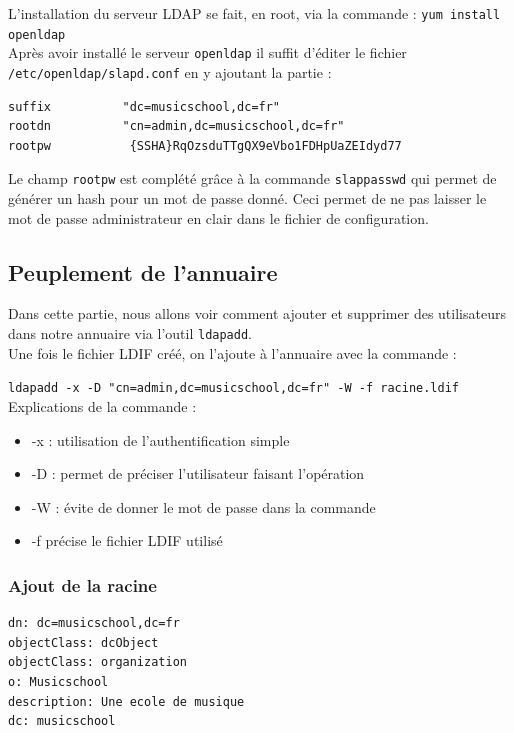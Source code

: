 \documentclass[12pt,a4paper,notitlepage]{article}
\begin{document}
L'installation du serveur LDAP se fait, en root, via la commande : \texttt{yum install openldap}\\

Après avoir installé le serveur \texttt{openldap} il suffit d'éditer le fichier \texttt{/etc/openldap/slapd.conf} en y ajoutant la partie : 

\begin{lstlisting}[title=Contenu du fichier slapd.conf]
suffix          "dc=musicschool,dc=fr"
rootdn          "cn=admin,dc=musicschool,dc=fr"
rootpw           {SSHA}RqOzsduTTgQX9eVbo1FDHpUaZEIdyd77

\end{lstlisting}

Le champ  \texttt{rootpw} est complété grâce à la commande \texttt{slappasswd} qui permet de générer un hash pour un mot de passe donné. Ceci permet de ne pas laisser le mot de passe administrateur en clair dans le fichier de configuration.\\


\subsection{Peuplement de l'annuaire}
Dans cette partie, nous allons voir comment ajouter et supprimer des utilisateurs dans notre annuaire via l'outil \texttt{ldapadd}.\\

Une fois le fichier LDIF créé, on l'ajoute à l'annuaire avec la commande :

\noindent \texttt{ldapadd -x -D "cn=admin,dc=musicschool,dc=fr" -W -f racine.ldif}\\

Explications de la commande :
\begin{itemize}
\item -x : utilisation de l'authentification simple
\item -D : permet de préciser l'utilisateur faisant l'opération
\item -W : évite de donner le mot de passe dans la commande
\item -f précise le fichier LDIF utilisé 
\end{itemize}


\subsubsection{Ajout de la racine}

\begin{lstlisting}[title=racine.ldif]
dn: dc=musicschool,dc=fr
objectClass: dcObject
objectClass: organization
o: Musicschool
description: Une ecole de musique 
dc: musicschool 
\end{lstlisting}
\end{document}
